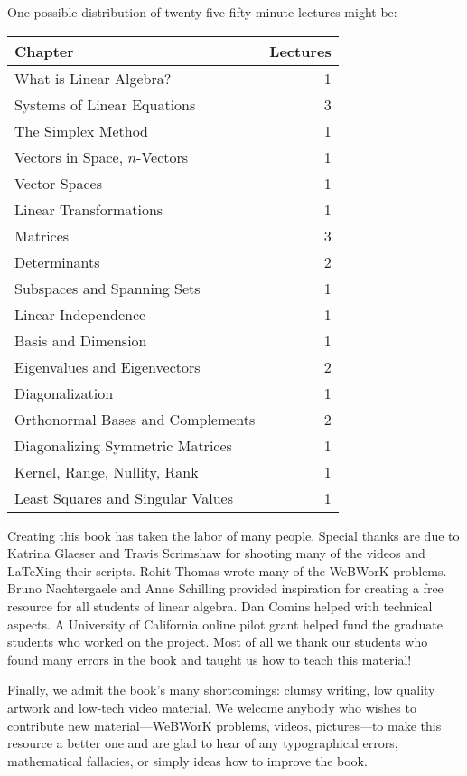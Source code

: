 \newpage 
\noindent
One possible distribution of twenty five fifty minute lectures might be:
\begin{center}
\begin{tabular}{lr}
Chapter & Lectures\\ \hline
What is Linear Algebra?&1\\
Systems of Linear Equations&3\\
The Simplex Method&1\\
Vectors in Space, $n$-Vectors&1\\
Vector Spaces&1\\
Linear Transformations&1\\
Matrices&3\\
Determinants&2\\
Subspaces and Spanning Sets&1\\
Linear Independence&1\\
Basis and Dimension&1\\
Eigenvalues and Eigenvectors&2\\
Diagonalization&1\\
Orthonormal Bases and Complements&2\\
Diagonalizing Symmetric Matrices&1\\
Kernel, Range, Nullity, Rank&1\\ 
Least Squares and Singular Values&1\\ \hline\end{tabular}
\end{center}

Creating this book has taken the labor of many people. Special  thanks are due to Katrina Glaeser  and Travis Scrimshaw
for shooting many of the videos and LaTeXing their scripts. Rohit Thomas wrote many of the WeBWorK problems. Bruno 
Nachtergaele and Anne Schilling provided inspiration for creating a free resource for all students of linear algebra.
Dan Comins helped with technical aspects. A University of California online pilot grant helped fund the graduate students
who worked on the project. Most of all we thank our students who found many errors in the book and taught us how to teach this material!

Finally, we admit the book's many shortcomings: clumsy writing, low quality artwork and low-tech video material. We welcome
anybody who wishes to contribute new material---WeBWorK problems, videos, pictures---to make this resource a better one and are glad to hear of any typographical errors,
mathematical fallacies, or simply ideas how to improve the book.

